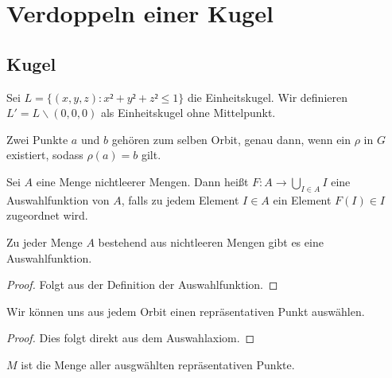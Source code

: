 \chapter{Verdoppeln einer Kugel}

\section{Kugel}
\begin{definition}\label{def:kugel_ohne_mittelpunkt}
Sei $L=\{(x,y,z):x²+y²+z²\leq1\}$ die Einheitskugel. Wir definieren $L'=L\backslash {(0,0,0)}$ als Einheitskugel ohne Mittelpunkt.
\end{definition}

\begin{definition}[Orbit] \label{def:orbit} 
Zwei Punkte $a$ und $b$ gehören zum selben Orbit, genau dann, wenn ein $\rho$ in $G$ existiert, sodass $\rho(a)=b$ gilt.
\end{definition}

\begin{definition}[Auswahlfunktion] \label{def:auswahlfunktion}
Sei $A$ eine Menge nichtleerer Mengen. Dann heißt $F:A\rightarrow\bigcup\limits_{I\in A}I$ eine Auswahlfunktion von $A$,
falls zu jedem Element $I\in A$ ein Element $F(I)\in I$ zugeordnet wird.    
\end{definition}  

\begin{theorem}[Auswahlaxiom] \label{theorem:auswahlaxiom}
Zu jeder Menge $A$ bestehend aus nichtleeren Mengen gibt es eine Auswahlfunktion.
\end{theorem}
\begin{proof} 
Folgt aus der Definition der Auswahlfunktion.
\end{proof}    

\begin{lemma} \label{theorem:rep_punkte}
Wir können uns aus jedem Orbit einen repräsentativen Punkt auswählen.
\end{lemma}
\begin{proof} 
Dies folgt direkt aus dem Auswahlaxiom.
\end{proof}

\begin{definition} \label{def:menge_rep_punkte} 
$M$ ist die Menge aller ausgwählten repräsentativen Punkte.
\end{definition} 

